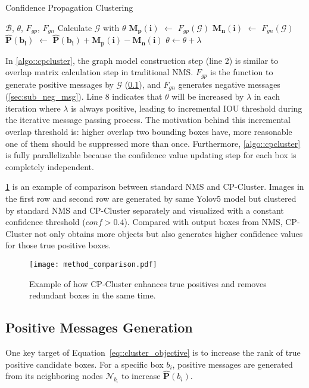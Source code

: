 \documentclass[10pt,twocolumn,letterpaper]{article}
\begin{document}
\begin{algorithm}
	\caption{Confidence Propagation Clustering}
  \label{algo::cpcluster}
	\begin{algorithmic}[1]
    \Require $\mathcal{B}$, $\theta$, $F_{gp}$, $F_{gn}$
      \State Calculate $\mathcal{G}$ with $\theta$
        \State $\mathbf{M_p(i)}$ $\leftarrow$ $F_{gp}(\mathcal{G})$ 
        \State $\mathbf{M_n(i)}$ $\leftarrow$ $F_{gn}(\mathcal{G})$ 
				\State $\mathbf{\hat{P}(b_i)}$ $\leftarrow$ $\mathbf{\hat{P}(b_i)}+\mathbf{M_p(i)}-\mathbf{M_n(i)}$
			\EndFor
      \State $\theta \leftarrow \theta+\lambda$
		\EndFor
	\end{algorithmic}
\end{algorithm}
In \cref{algo::cpcluster}, the graph model construction step (line 2) is similar to overlap matrix calculation step in traditional NMS. $F_{gp}$ is the function to generate positive messages by $\mathcal{G}$ (\cref{sec:sub_pos_msg}), and $F_{gn}$ generates negative messages (\cref{sec:sub_neg_msg}).
Line 8 indicates that $\theta$ will be increased by $\lambda$ in each iteration where $\lambda$ is always positive, leading to incremental IOU threshold during the iterative message passing process.
The motivation behind this incremental overlap threshold is: higher overlap two bounding boxes have, more reasonable one of them should be suppressed more than once.
Furthermore, \cref{algo::cpcluster} is fully parallelizable because the confidence value updating step for each box is completely independent.

\cref{fig:cp_example} is an example of comparison between standard NMS and CP-Cluster. Images in the first row and second row are generated by same Yolov5 model but clustered by standard NMS and CP-Cluster separately and visualized with a constant confidence threshold ($conf>0.4$).
Compared with output boxes from NMS, CP-Cluster not only obtains more objects but also generates higher confidence values for those true positive boxes.
\begin{figure}[h!]
  \centering
  \texttt{[image: method\_comparison.pdf]}
  \caption{Example of how CP-Cluster enhances true positives and removes redundant boxes in the same time.}
  \label{fig:cp_example}
\end{figure}

\subsection{Positive Messages Generation}
\label{sec:sub_pos_msg}
One key target of Equation~\eqref{eq::cluster_objective} is to increase the rank of true positive candidate boxes.
For a specific box $b_{i}$, positive messages are generated from its neighboring nodes $\mathcal{N}_{b_{i}}$ to increase $\mathbf{\hat{P}}(b_i)$.
\end{document}

